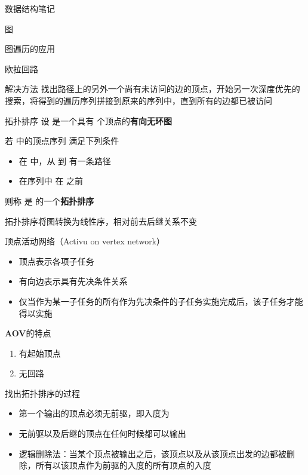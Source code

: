 \documentclass[
  ignorenonframetext,
]{beamer}
\providecommand{\tightlist}{%
  \setlength{\itemsep}{0pt}\setlength{\parskip}{0pt}}
\begin{document}
\begin{frame}[fragile]{数据结构笔记}
\begin{block}{图}
\begin{block}{图遍历的应用}
\begin{block}{欧拉回路}
\begin{block}{解决方法}
\protect{}\label{ux89e3ux51b3ux65b9ux6cd5}
找出路径上的另外一个尚有未访问的边的顶点，开始另一次深度优先的搜索，将得到的遍历序列拼接到原来的序列中，直到所有的边都已被访问

\end{block}
\end{block}

\begin{block}{拓扑排序}
\protect{}\label{ux62d3ux6251ux6392ux5e8f}
设 {} 是一个具有 {} 个顶点的\textbf{有向无环图}

若 {} 中的顶点序列 {} 满足下列条件

\begin{itemize}
\tightlist
\item
  在 {} 中，从 {} 到 {} 有一条路径
\item
  在序列中 {} 在 {} 之前
\end{itemize}

则称 {} 是 {} 的一个\textbf{拓扑排序}

拓扑排序将图转换为线性序，相对前去后继关系不变

\begin{block}{顶点活动网络（Activu on vertex network）}
\protect{}\label{ux9876ux70b9ux6d3bux52a8ux7f51ux7edcactivu-on-vertex-network}
\begin{itemize}
\tightlist
\item
  顶点表示各项子任务
\item
  有向边表示具有先决条件关系
\item
  仅当作为某一子任务的所有作为先决条件的子任务实施完成后，该子任务才能得以实施
\end{itemize}

\textbf{AOV}的特点

\begin{enumerate}
\tightlist
\item
  有起始顶点
\item
  无回路
\end{enumerate}
\end{block}

\begin{block}{找出拓扑排序的过程}
\protect{}\label{ux627eux51faux62d3ux6251ux6392ux5e8fux7684ux8fc7ux7a0b}
\begin{itemize}
\tightlist
\item
  第一个输出的顶点必须无前驱，即入度为 {}
\item
  无前驱以及后继的顶点在任何时候都可以输出
\item
  逻辑删除法：当某个顶点被输出之后，该顶点以及从该顶点出发的边都被删除，所有以该顶点作为前驱的入度的所有顶点的入度
  {}
\end{itemize}
\end{block}


\end{block}
\end{block}
\end{block}
\end{frame}
\end{document}
